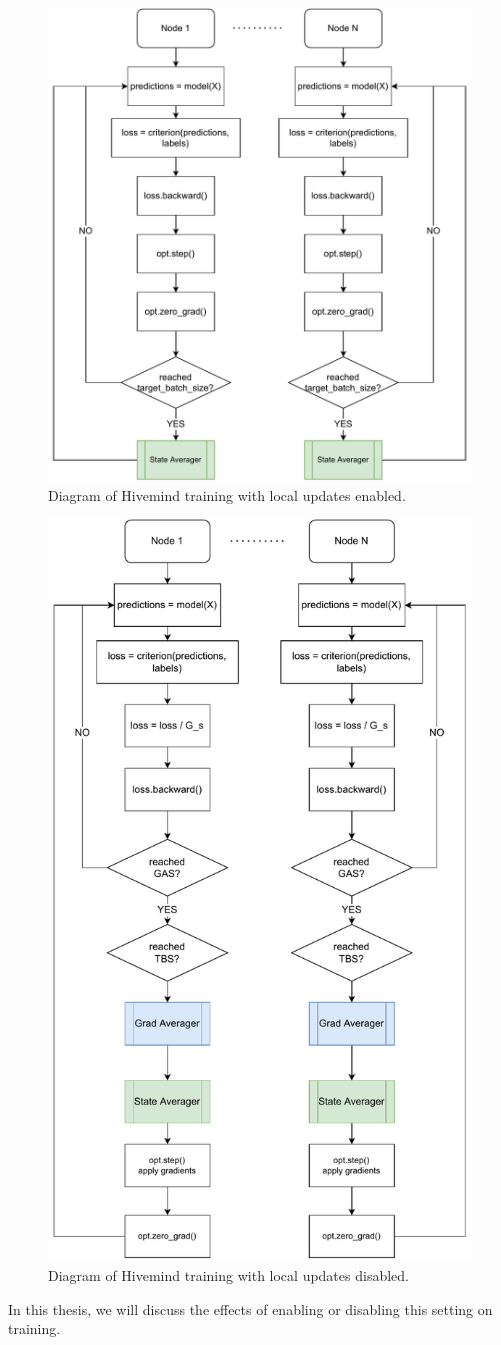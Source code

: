 \begin{figure}[ht]
    \centering
    \caption{Diagram of Hivemind training with local updates enabled.}
    \label{fig:use-local-updates_true}
    \includegraphics[width=0.8 \textwidth]{./figures/02_use-local-updates_true.pdf}
\end{figure}

\begin{figure}[ht]
    \centering
    \caption{Diagram of Hivemind training with local updates disabled.}
    \label{fig:use-local-updates_false}
    \includegraphics[width=0.7 \textwidth]{./figures/02_use-local-updates_false.pdf}
\end{figure}


In this thesis, we will discuss the effects of enabling or disabling this setting on training.
